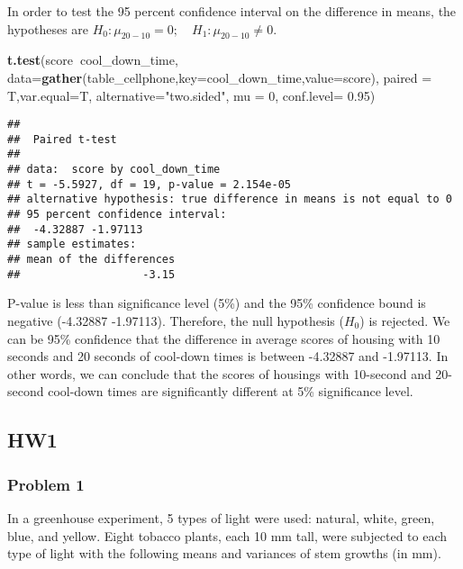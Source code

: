 \documentclass[]{article}
\newenvironment{Shaded}{\begin{snugshade}}{\end{snugshade}}
\newcommand{\DataTypeTok}[1]{\textcolor[rgb]{0.13,0.29,0.53}{#1}}
\newcommand{\DecValTok}[1]{\textcolor[rgb]{0.00,0.00,0.81}{#1}}
\newcommand{\FloatTok}[1]{\textcolor[rgb]{0.00,0.00,0.81}{#1}}
\newcommand{\KeywordTok}[1]{\textcolor[rgb]{0.13,0.29,0.53}{\textbf{#1}}}
\newcommand{\NormalTok}[1]{#1}
\newcommand{\OperatorTok}[1]{\textcolor[rgb]{0.81,0.36,0.00}{\textbf{#1}}}
\newcommand{\StringTok}[1]{\textcolor[rgb]{0.31,0.60,0.02}{#1}}
\begin{document}
In order to test the 95 percent confidence interval on the difference in
means, the hypotheses are
\(H_0:\mu_{20-10}=0;\quad H_1:\mu_{20-10}\neq0\).

\begin{Shaded}
\begin{Highlighting}[]
\KeywordTok{t.test}\NormalTok{(score}\OperatorTok{~}\NormalTok{cool_down_time, }\DataTypeTok{data=}\KeywordTok{gather}\NormalTok{(table_cellphone,}\DataTypeTok{key=}\NormalTok{cool_down_time,}\DataTypeTok{value=}\NormalTok{score), }\DataTypeTok{paired =}\NormalTok{ T,}\DataTypeTok{var.equal=}\NormalTok{T, }\DataTypeTok{alternative=}\StringTok{"two.sided"}\NormalTok{, }\DataTypeTok{mu =} \DecValTok{0}\NormalTok{, }\DataTypeTok{conf.level=} \FloatTok{0.95}\NormalTok{)}
\end{Highlighting}
\end{Shaded}

\begin{verbatim}
## 
##  Paired t-test
## 
## data:  score by cool_down_time
## t = -5.5927, df = 19, p-value = 2.154e-05
## alternative hypothesis: true difference in means is not equal to 0
## 95 percent confidence interval:
##  -4.32887 -1.97113
## sample estimates:
## mean of the differences 
##                   -3.15
\end{verbatim}

P-value is less than significance level (5\%) and the 95\% confidence
bound is negative (-4.32887 -1.97113). Therefore, the null hypothesis
(\(H_0\)) is rejected. We can be 95\% confidence that the difference in
average scores of housing with 10 seconds and 20 seconds of cool-down
times is between -4.32887 and -1.97113. In other words, we can conclude
that the scores of housings with 10-second and 20-second cool-down times
are significantly different at 5\% significance level.

\hypertarget{hw1}{%
\subsection{HW1}\label{hw1}}

\hypertarget{problem-1}{%
\subsubsection{Problem 1}\label{problem-1}}

In a greenhouse experiment, 5 types of light were used: natural, white,
green, blue, and yellow. Eight tobacco plants, each 10 mm tall, were
subjected to each type of light with the following means and variances
of stem growths (in mm).
\end{document}
